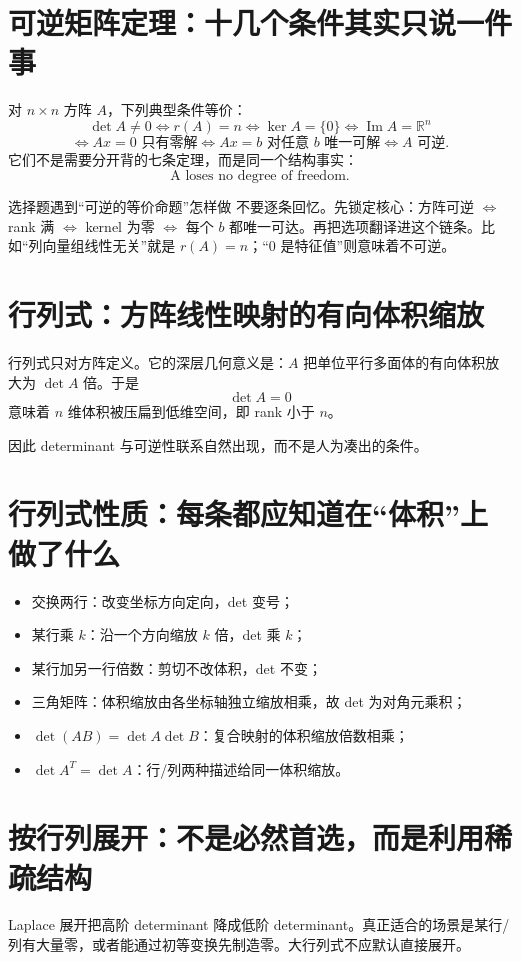 \documentclass[11pt,a4paper,openany]{ctexbook}
\begin{document}
\section{可逆矩阵定理：十几个条件其实只说一件事}
对 $n\times n$ 方阵 $A$，下列典型条件等价：
\[
\det A\neq0
\iff r(A)=n
\iff \ker A=\{0\}
\iff \operatorname{Im}A=\mathbb R^n
\]
\[
\iff Ax=0\text{ 只有零解}
\iff Ax=b\text{ 对任意 }b\text{ 唯一可解}
\iff A\text{ 可逆}.
\]
它们不是需要分开背的七条定理，而是同一个结构事实：
\[
\boxed{\text{A loses no degree of freedom.}}
\]

\begin{methodbox}{选择题遇到“可逆的等价命题”怎样做}
不要逐条回忆。先锁定核心：方阵可逆 $\Leftrightarrow$ rank 满 $\Leftrightarrow$ kernel 为零 $\Leftrightarrow$ 每个 $b$ 都唯一可达。再把选项翻译进这个链条。比如“列向量组线性无关”就是 $r(A)=n$；“0 是特征值”则意味着不可逆。
\end{methodbox}

\section{行列式：方阵线性映射的有向体积缩放}
行列式只对方阵定义。它的深层几何意义是：$A$ 把单位平行多面体的有向体积放大为 $\det A$ 倍。于是
\[
\det A=0
\]
意味着 $n$ 维体积被压扁到低维空间，即 rank 小于 $n$。

因此 determinant 与可逆性联系自然出现，而不是人为凑出的条件。

\section{行列式性质：每条都应知道在“体积”上做了什么}
\begin{itemize}
  \item 交换两行：改变坐标方向定向，det 变号；
  \item 某行乘 $k$：沿一个方向缩放 $k$ 倍，det 乘 $k$；
  \item 某行加另一行倍数：剪切不改体积，det 不变；
  \item 三角矩阵：体积缩放由各坐标轴独立缩放相乘，故 det 为对角元乘积；
  \item $\det(AB)=\det A\det B$：复合映射的体积缩放倍数相乘；
  \item $\det A^T=\det A$：行/列两种描述给同一体积缩放。
\end{itemize}

\section{按行列展开：不是必然首选，而是利用稀疏结构}
Laplace 展开把高阶 determinant 降成低阶 determinant。真正适合的场景是某行/列有大量零，或者能通过初等变换先制造零。大行列式不应默认直接展开。
\end{document}

